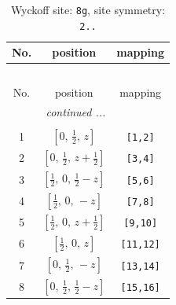 \documentclass[fleqn,8pt]{jsarticle}
\begin{document}
\begin{longtable}{ccc}
\caption{Wyckoff site: {\tt 8g}, site symmetry: {\tt 2..}}
 \\
 \hline \hline
No. & position & mapping \\ \hline \endfirsthead

\multicolumn{2}{l}{\tablename\ \thetable{}} \\
 \hline \hline
No. & position & mapping \\ \hline \endhead

 \hline \hline
\multicolumn{2}{r}{\footnotesize\it continued ...} \\ \endfoot

 \hline \hline
\multicolumn{2}{r}{} \\ \endlastfoot

1 & $\left[ 0,\, \frac{1}{2},\, z \right]$ & {\tt [1,2]} \\ \hline
2 & $\left[ 0,\, \frac{1}{2},\, z + \frac{1}{2} \right]$ & {\tt [3,4]} \\ \hline
3 & $\left[ \frac{1}{2},\, 0,\, \frac{1}{2} - z \right]$ & {\tt [5,6]} \\ \hline
4 & $\left[ \frac{1}{2},\, 0,\, - z \right]$ & {\tt [7,8]} \\ \hline
5 & $\left[ \frac{1}{2},\, 0,\, z + \frac{1}{2} \right]$ & {\tt [9,10]} \\ \hline
6 & $\left[ \frac{1}{2},\, 0,\, z \right]$ & {\tt [11,12]} \\ \hline
7 & $\left[ 0,\, \frac{1}{2},\, - z \right]$ & {\tt [13,14]} \\ \hline
8 & $\left[ 0,\, \frac{1}{2},\, \frac{1}{2} - z \right]$ & {\tt [15,16]} \\
\end{longtable}
\renewcommand{\arraystretch}{1.2}
\end{document}
